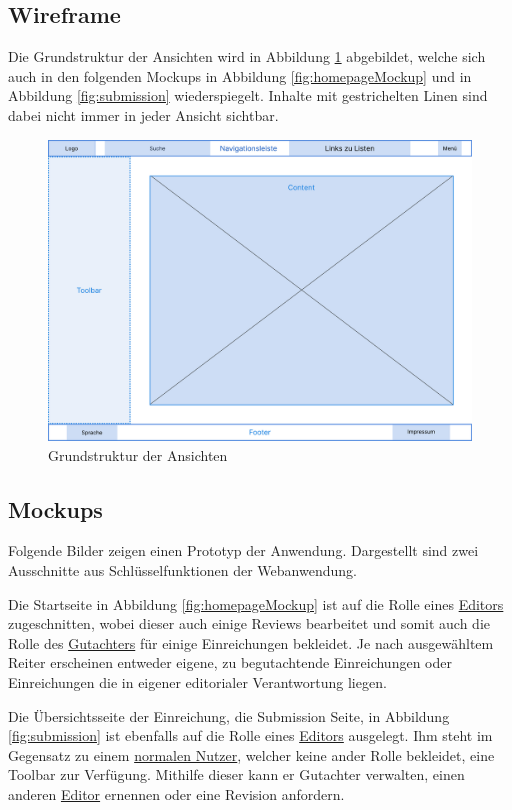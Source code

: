 \subsection{Wireframe}

Die Grundstruktur der Ansichten wird in Abbildung \ref{fig:wireframe} abgebildet, welche sich auch in den folgenden Mockups in Abbildung \ref{fig:homepageMockup} und in Abbildung \ref{fig:submission} wiederspiegelt.
Inhalte mit gestrichelten Linen sind dabei nicht immer in jeder Ansicht sichtbar.

\begin{figure}[H]
	\centering
	\includegraphics[width=0.85\linewidth]{graphics/Wireframe}
	\caption{Grundstruktur der Ansichten}
	\label{fig:wireframe}
\end{figure}

\subsection{Mockups}

Folgende Bilder zeigen einen Prototyp der Anwendung.
Dargestellt sind zwei Ausschnitte aus Schlüsselfunktionen der Webanwendung.

Die Startseite in Abbildung \ref{fig:homepageMockup} ist auf die Rolle eines \hyperref[mkrit:editor]{Editors} zugeschnitten, wobei dieser auch einige
Reviews bearbeitet und somit auch die Rolle des \hyperref[mkrit:gutachter]{Gutachters} für einige Einreichungen bekleidet.
Je nach ausgewähltem Reiter erscheinen entweder eigene, zu begutachtende Einreichungen oder Einreichungen die in eigener editorialer Verantwortung liegen.

Die Übersichtsseite der Einreichung, die Submission Seite, in Abbildung \ref{fig:submission} ist ebenfalls auf die Rolle eines \hyperref[mkrit:editor]{Editors} ausgelegt.
Ihm steht im Gegensatz zu einem \hyperref[mkrit:angemeldet]{normalen Nutzer}, welcher keine ander Rolle bekleidet, eine Toolbar zur Verfügung.
Mithilfe dieser kann er Gutachter verwalten, einen anderen \hyperref[mkrit:editor]{Editor} ernennen oder eine Revision anfordern.


